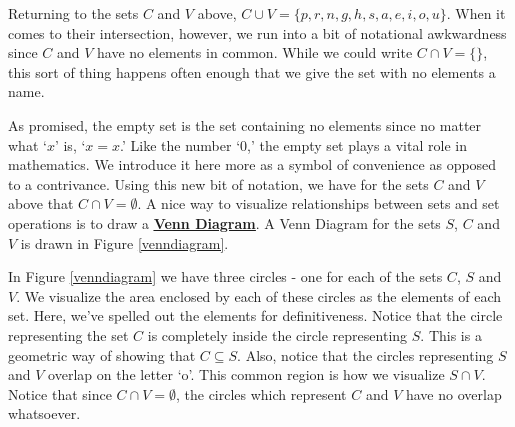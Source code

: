 \smallskip

Returning to the sets $C$ and $V$  above, $C \cup V = \{ p, r, n, g, h, s, a, e, i, o, u\}$. When it comes to their intersection, however, we run into a bit of notational awkwardness since $C$ and $V$ have no elements in common.  While we could write $C \cap V = \{ \}$, this sort of thing happens often enough that we give the set with no elements a name. 

\medskip


\medskip

As promised, the empty set is the set containing no elements since no matter what `$x$' is, `$x = x$.'  Like the number `$0$,'  the empty set plays a vital role in mathematics. We introduce it here more as a symbol of convenience as opposed to a contrivance.
Using this new bit of notation, we have for the sets $C$ and $V$ above that $C \cap V = \emptyset$.    A nice way to visualize relationships between sets and set operations is to draw a  \href{http://en.wikipedia.org/wiki/Venn_diagram}{\underline{\textbf{Venn Diagram}}}.  A Venn Diagram for the sets $S$, $C$ and $V$ is drawn in Figure \ref{venndiagram}.


In Figure \ref{venndiagram} we have three circles - one for each of the sets $C$, $S$ and $V$.  We visualize the area enclosed by each of these circles as the elements of each set.  Here, we've spelled out the elements for definitiveness.  Notice that the circle representing the set $C$ is completely inside the circle representing $S$.  This is a geometric way of  showing that $C \subseteq S$.  Also, notice that the circles representing $S$ and $V$ overlap on the letter `o'.  This common region is how we visualize $S \cap V$.  Notice that since $C \cap V = \emptyset$, the circles which represent $C$ and $V$ have no overlap whatsoever.  

